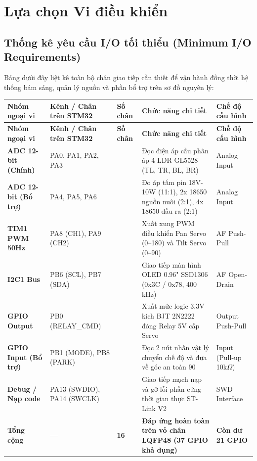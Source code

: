 \documentclass[12pt,a4paper]{report}
\begin{document}
\section{Lựa chọn Vi điều khiển}

\subsection{Thống kê yêu cầu I/O tối thiểu (Minimum I/O Requirements)}

Bảng dưới đây liệt kê toàn bộ chân giao tiếp cần thiết để vận hành đồng thời hệ thống bám sáng, quản lý nguồn và phần bổ trợ trên sơ đồ nguyên lý:

{
\small
\setlength{\LTleft}{0pt}\setlength{\LTright}{0pt}
\begin{longtable}{>{\raggedright\arraybackslash}p{}>{\raggedright\arraybackslash}p{}>{\raggedright\arraybackslash}p{}>{\raggedright\arraybackslash}p{}>{\raggedright\arraybackslash}p{}}
\toprule
\textbf{Nhóm ngoại vi} & \textbf{Kênh / Chân trên STM32} & \textbf{Số chân} & \textbf{Chức năng chi tiết} & \textbf{Chế độ cấu hình} \\
\midrule
\endfirsthead
\toprule
\textbf{Nhóm ngoại vi} & \textbf{Kênh / Chân trên STM32} & \textbf{Số chân} & \textbf{Chức năng chi tiết} & \textbf{Chế độ cấu hình} \\
\midrule
\endhead
\bottomrule
\endfoot
\bottomrule
\endlastfoot
\textbf{ADC 12-bit (Chính)} & PA0, PA1, PA2, PA3 & 4 & Đọc điện áp cầu phân áp 4\texttimes{} LDR GL5528 (TL, TR, BL, BR) & Analog Input \\
\textbf{ADC 12-bit (Bổ trợ)} & PA4, PA5, PA6 & 3 & Đo áp tấm pin 18V-10W (11:1), 2x 18650 nguồn nuôi (2:1), 4x 18650 đầu ra (2:1) & Analog Input \\
\textbf{TIM1 PWM 50Hz} & PA8 (CH1), PA9 (CH2) & 2 & Xuất xung PWM điều khiển Pan Servo (0\textdegree{}--180\textdegree{}) và Tilt Servo (0\textdegree{}--90\textdegree{}) & AF Push-Pull \\
\textbf{I2C1 Bus} & PB6 (SCL), PB7 (SDA) & 2 & Giao tiếp màn hình OLED 0.96" SSD1306 (0x3C / 0x78, 400 kHz) & AF Open-Drain \\
\textbf{GPIO Output} & PB0 (RELAY\_CMD) & 1 & Xuất mức logic 3.3V kích BJT 2N2222 đóng Relay 5V cấp Servo & Output Push-Pull \\
\textbf{GPIO Input (Bổ trợ)} & PB1 (MODE), PB8 (PARK) & 2 & Đọc 2 nút nhấn vật lý chuyển chế độ và đưa về góc an toàn 90\textdegree{} & Input (Pull-up 10k\ensuremath{\Omega}) \\
\textbf{Debug / Nạp code} & PA13 (SWDIO), PA14 (SWCLK) & 2 & Giao tiếp mạch nạp và gỡ lỗi phần cứng thời gian thực ST-Link V2 & SWD Interface \\
\midrule
\textbf{Tổng cộng} & \textbf{---} & \textbf{16} & \textbf{Đáp ứng hoàn toàn trên vỏ chân LQFP48 (37 GPIO khả dụng)} & \textbf{Còn dư 21 GPIO} \\
\end{longtable}
}
\end{document}
